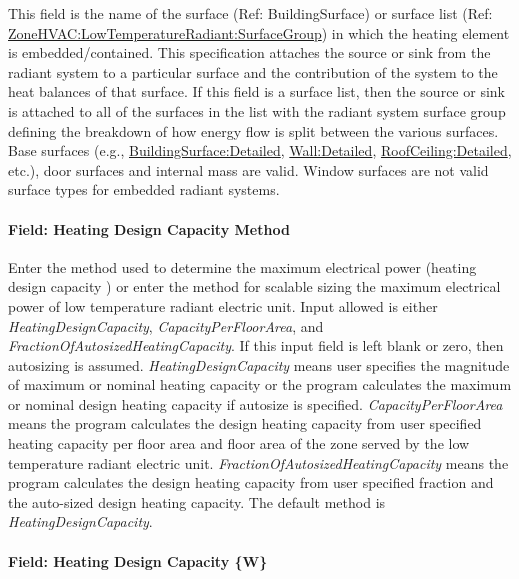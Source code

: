 This field is the name of the surface (Ref: BuildingSurface) or surface list (Ref: \hyperref[zonehvaclowtemperatureradiantsurfacegroup]{ZoneHVAC:LowTemperatureRadiant:SurfaceGroup}) in which the heating element is embedded/contained. This specification attaches the source or sink from the radiant system to a particular surface and the contribution of the system to the heat balances of that surface. If this field is a surface list, then the source or sink is attached to all of the surfaces in the list with the radiant system surface group defining the breakdown of how energy flow is split between the various surfaces. Base surfaces (e.g., \hyperref[buildingsurfacedetailed]{BuildingSurface:Detailed}, \hyperref[walldetailed]{Wall:Detailed}, \hyperref[roofceilingdetailed]{RoofCeiling:Detailed}, etc.), door surfaces and internal mass are valid. Window surfaces are not valid surface types for embedded radiant systems.

\paragraph{Field: Heating Design Capacity Method}\label{field-heating-design-capacity-method-6}

Enter the method used to determine the maximum electrical power (heating design capacity ) or enter the method for scalable sizing the maximum electrical power of low temperature radiant electric unit. Input allowed is either \emph{HeatingDesignCapacity}, \emph{CapacityPerFloorArea}, and \emph{FractionOfAutosizedHeatingCapacity}. If this input field is left blank or zero, then autosizing is assumed. \emph{HeatingDesignCapacity} means user specifies the magnitude of maximum or nominal heating capacity or the program calculates the maximum or nominal design heating capacity if autosize is specified. \emph{CapacityPerFloorArea} means the program calculates the design heating capacity from user specified heating capacity per floor area and floor area of the zone served by the low temperature radiant electric unit. \emph{FractionOfAutosizedHeatingCapacity} means the program calculates the design heating capacity from user specified fraction and the auto-sized design heating capacity. The default method is \emph{HeatingDesignCapacity}.

\paragraph{Field: Heating Design Capacity \{W\}}\label{field-heating-design-capacity-w-6}


